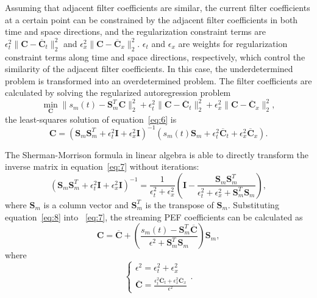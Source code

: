 Assuming that adjacent filter coefficients are similar, the current filter
coefficients at a certain point can be constrained by the adjacent filter
coefficients in both time and space directions, and the regularization
constraint terms are
$\epsilon_t^2\parallel{\mathbf{C}-\overline{\mathbf{C}}_t}\parallel_2^2$ and
$\epsilon_x^2\parallel{\mathbf{C}-\overline{\mathbf{C}}_x}\parallel_2^2$.
$\epsilon_t$ and $\epsilon_x$ are weights for regularization constraint
terms along time and space directions, respectively, which control the
similarity of the adjacent filter coefficients. In this case, the
underdetermined problem is transformed into an overdetermined problem.
The filter coefficients are calculated by solving the regularized
autoregression problem
\begin{equation}
  \label{eq:6}
  \min_{\mathbf{C}}\parallel{s_m(t)-\mathbf{S}_m^T\mathbf{C}}\parallel_2^2+
  \epsilon_t^2\parallel{\mathbf{C}-\overline{\mathbf{C}}_t}\parallel_2^2+
  \epsilon_x^2\parallel{\mathbf{C}-\overline{\mathbf{C}}_x}\parallel_2^2,
\end{equation}
the least-squares solution of equation~\ref{eq:6} is
\begin{equation}
  \label{eq:7}
  \mathbf{C}=(\mathbf{S}_m\mathbf{S}_m^T+\epsilon_t^2\mathbf{I}+ 
  \epsilon_x^2\mathbf{I})^{-1}(s_m(t)\mathbf{S}_m+\epsilon_t^2
  \overline{\mathbf{C}}_t+\epsilon_x^2\overline{\mathbf{C}}_x).
\end{equation}

The Sherman-Morrison formula in linear algebra \cite[]{Hager89} is able to
directly transform the inverse matrix in equation~\ref{eq:7} without
iterations:
\begin{equation}
  \label{eq:8}
  (\mathbf{S}_m\mathbf{S}_m^T+\epsilon_t^2\mathbf{I}+\epsilon_x^2
  \mathbf{I})^{-1}=\frac{1}{\epsilon_t^2+\epsilon_x^2}(\mathbf{I}-
  \frac{\mathbf{S}_m\mathbf{S}_m^T}{\epsilon_t^2+\epsilon_x^2+
  \mathbf{S}_m^T\mathbf{S}_m}),
\end{equation}
where $\mathbf{S}_m$ is a column vector and $\mathbf{S}_m^T$ is the
transpose of $\mathbf{S}_m$. Substituting equation~\ref{eq:8} into
~\ref{eq:7}, the streaming PEF coefficients can be calculated as
\begin{equation}
  \label{eq:9}
  \mathbf{C}=\overline{\mathbf{C}}+(\frac{s_m(t)-\mathbf{S}_m^T\overline{
  \mathbf{C}}}{\epsilon^2+\mathbf{S}_m^T\mathbf{S}_m})\mathbf{S}_m,
\end{equation}
where
\begin{equation}
  \label{eq:10}
  \begin{cases}
    \epsilon^2=\epsilon_t^2+\epsilon_x^2 \\
    \overline{\mathbf{C}}=\frac{\epsilon_t^2\overline{\mathbf{C}}_t+
      \epsilon_x^2\overline{\mathbf{C}}_x}{\epsilon^2}
  \end{cases}.
\end{equation}


